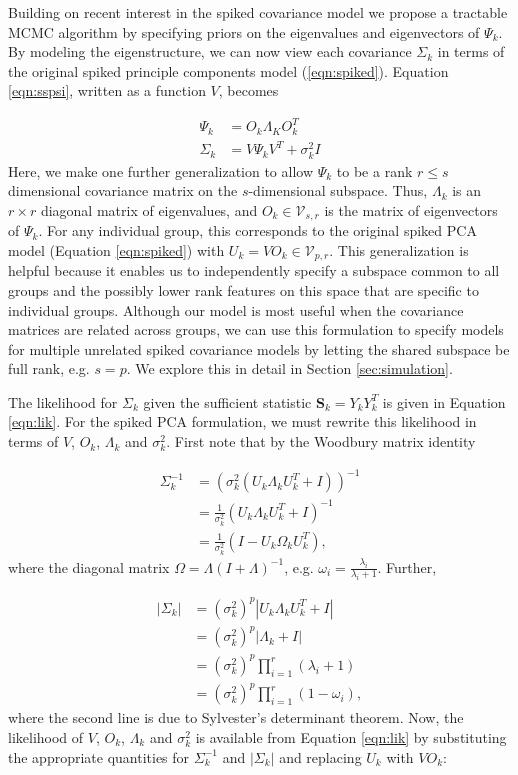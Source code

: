 \documentclass[12pt]{article}
\begin{document}
Building on recent interest in the spiked covariance model
\citep{Donoho2013, Paul2007} we propose a tractable MCMC algorithm by
specifying priors on the eigenvalues and eigenvectors of $\Psi_k$.  By
modeling the eigenstructure, we can now view each covariance
$\Sigma_k$ in terms of the original spiked principle components model
(\ref{eqn:spiked}).  Equation \ref{eqn:sspsi}, written as a function
$V$, becomes

\begin{align}
\nonumber \Psi_k &= O_k\Lambda_KO_k^T\\
\Sigma_k &= V\Psi_kV^T + \sigma^2_kI
\label{eqn:ss}
\end{align}
%
\noindent Here, we make one further generalization to allow $\Psi_k$
to be a rank $r \leq s$ dimensional covariance matrix on the
$s$-dimensional subspace.  Thus, $\Lambda_k$ is an $r \times r$
diagonal matrix of eigenvalues, and $O_k \in \mathcal{V}_{s,r}$ is the
matrix of eigenvectors of $\Psi_k$.  For any individual group, this
corresponds to the original spiked PCA model (Equation
\ref{eqn:spiked}) with $U_k = VO_k \in \mathcal{V}_{p, r}$.  This
generalization is helpful because it enables us to independently
specify a subspace common to all groups and the possibly lower rank
features on this space that are specific to individual groups.
Although our model is most useful when the covariance matrices are
related across groups, we can use this formulation to specify models
for multiple unrelated spiked covariance models by letting the shared
subspace be full rank, e.g. $s=p$.  We explore this in detail in
Section \ref{sec:simulation}.


The likelihood for $\Sigma_k$ given the sufficient statistic
$\mathbf{S}_k = Y_kY_k^T$ is given in Equation \ref{eqn:lik}.  For the
spiked PCA formulation, we must rewrite this likelihood in terms of $V$, $O_k$,
$\Lambda_k$ and $\sigma_k^2$.  First note that by the Woodbury matrix
identity
 
\begin{align}
\nonumber \Sigma^{-1}_k &=  (\sigma_k^2(U_k\Lambda_kU_k^T+I))^{-1}\\
\nonumber &= \frac{1}{\sigma_k^2}(U_k\Lambda_kU_k^T+I)^{-1}\\
&= \frac{1}{\sigma_k^2}(I-U_k\Omega_kU_k^T),
\end{align}
%
\noindent where the diagonal matrix $\Omega = \Lambda(I+\Lambda)^{-1}$, e.g. $\omega_i = \frac{\lambda_i}{\lambda_{i}+1}$.  Further, 

\begin{align}
\nonumber |\Sigma_k| &= (\sigma_k^2)^{p}|U_k\Lambda_kU_k^T+I|\\
\nonumber &= (\sigma_k^2)^{p}|\Lambda_k+I| \\
\nonumber &= (\sigma_k^2)^{p}\prod_{i=1}^r(\lambda_i+1)\\
&= (\sigma_k^2)^{p}\prod_{i=1}^r(1-\omega_i),
\end{align}
%
\noindent where the second line is due to Sylvester's determinant
theorem.  Now, the likelihood of $V$, $O_k$, $\Lambda_k$ and
$\sigma_k^2$ is available from Equation \ref{eqn:lik} by substituting
the appropriate quantities for $\Sigma^{-1}_k$ and $|\Sigma_k|$ and
replacing $U_k$ with $VO_k$:
\end{document}
